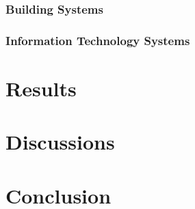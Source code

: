         \subsubsection{Building Systems}
        \subsubsection{Information Technology Systems}
    
\section{Results}
\section{Discussions}
\section{Conclusion}